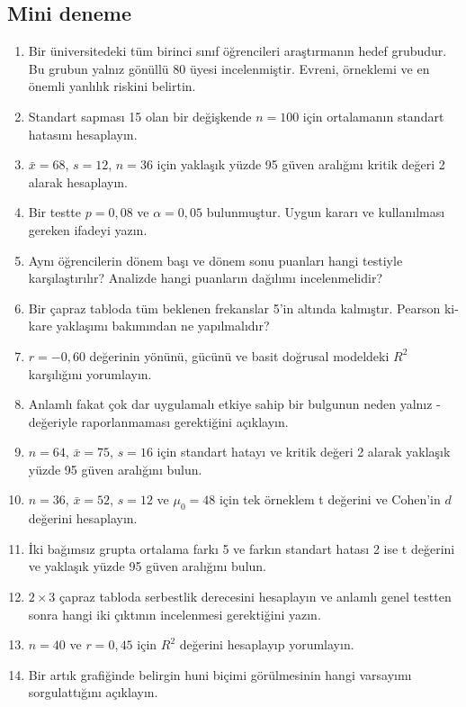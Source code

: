 \subsection*{Mini deneme}

\begin{enumerate}
  \item Bir üniversitedeki tüm birinci sınıf öğrencileri araştırmanın hedef
  grubudur. Bu grubun yalnız gönüllü 80 üyesi incelenmiştir. Evreni, örneklemi
  ve en önemli yanlılık riskini belirtin.
  \item Standart sapması 15 olan bir değişkende $n=100$ için ortalamanın
  standart hatasını hesaplayın.
  \item $\bar x=68$, $s=12$, $n=36$ için yaklaşık yüzde 95 güven aralığını
  kritik değeri 2 alarak hesaplayın.
  \item Bir testte $p=0{,}08$ ve $\alpha=0{,}05$ bulunmuştur. Uygun kararı ve
  kullanılması gereken ifadeyi yazın.
  \item Aynı öğrencilerin dönem başı ve dönem sonu puanları hangi \tstat testiyle
  karşılaştırılır? Analizde hangi puanların dağılımı incelenmelidir?
  \item Bir çapraz tabloda tüm beklenen frekanslar 5'in altında kalmıştır.
  Pearson ki-kare yaklaşımı bakımından ne yapılmalıdır?
  \item $r=-0{,}60$ değerinin yönünü, gücünü ve basit doğrusal modeldeki
  $R^2$ karşılığını yorumlayın.
  \item Anlamlı fakat çok dar uygulamalı etkiye sahip bir bulgunun neden
  yalnız \pval-değeriyle raporlanmaması gerektiğini açıklayın.
  \item $n=64$, $\bar x=75$, $s=16$ için standart hatayı ve kritik değeri 2
  alarak yaklaşık yüzde 95 güven aralığını bulun.
  \item $n=36$, $\bar x=52$, $s=12$ ve $\mu_0=48$ için tek örneklem t
  değerini ve Cohen'in $d$ değerini hesaplayın.
  \item İki bağımsız grupta ortalama farkı 5 ve farkın standart hatası 2 ise
  t değerini ve yaklaşık yüzde 95 güven aralığını bulun.
  \item $2\times3$ çapraz tabloda serbestlik derecesini hesaplayın ve anlamlı
  genel testten sonra hangi iki çıktının incelenmesi gerektiğini yazın.
  \item $n=40$ ve $r=0{,}45$ için $R^2$ değerini hesaplayıp yorumlayın.
  \item Bir artık grafiğinde belirgin huni biçimi görülmesinin hangi varsayımı
  sorgulattığını açıklayın.
\end{enumerate}

